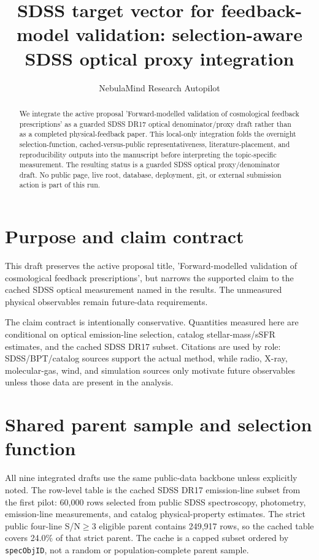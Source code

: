 \documentclass[twocolumn]{aastex631}
\begin{document}
\title{SDSS target vector for feedback-model validation: selection-aware SDSS optical proxy integration}
\author{NebulaMind Research Autopilot}

\begin{abstract}
We integrate the active proposal 'Forward-modelled validation of cosmological feedback prescriptions' as a guarded SDSS DR17 optical denominator/proxy draft rather than as a completed physical-feedback paper. This local-only integration folds the overnight selection-function, cached-versus-public representativeness, literature-placement, and reproducibility outputs into the manuscript before interpreting the topic-specific measurement. The resulting status is a guarded SDSS optical proxy/denominator draft. No public page, live root, database, deployment, git, or external submission action is part of this run.
\end{abstract}


\section{Purpose and claim contract}\label{sec:purpose}
This draft preserves the active proposal title, 'Forward-modelled validation of cosmological feedback prescriptions', but narrows the supported claim to the cached SDSS optical measurement named in the results. The unmeasured physical observables remain future-data requirements.

The claim contract is intentionally conservative. Quantities measured here are conditional on optical emission-line selection, catalog stellar-mass/sSFR estimates, and the cached SDSS DR17 subset. Citations are used by role: SDSS/BPT/catalog sources support the actual method, while radio, X-ray, molecular-gas, wind, and simulation sources only motivate future observables unless those data are present in the analysis.


\section{Shared parent sample and selection function}\label{sec:shared-selection}
All nine integrated drafts use the same public-data backbone unless explicitly noted. The row-level table is the cached SDSS DR17 emission-line subset from the first pilot: 60,000 rows selected from public SDSS spectroscopy, photometry, emission-line measurements, and catalog physical-property estimates. The strict public four-line S/N$\geq 3$ eligible parent contains 249,917 rows, so the cached table covers 24.0\% of that strict parent. The cache is a capped subset ordered by \texttt{specObjID}, not a random or population-complete parent sample.
\end{document}
